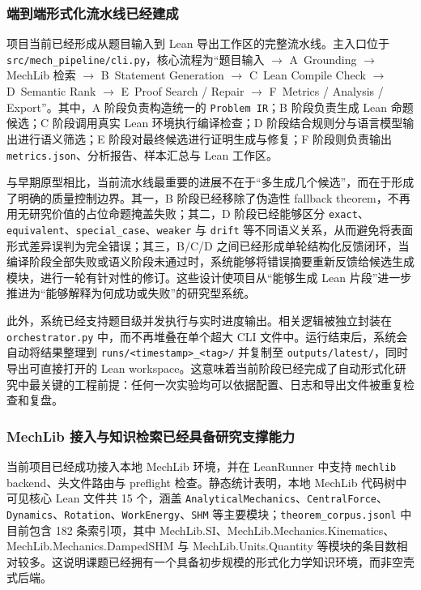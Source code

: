 \documentclass[12pt,a4paper]{ctexart}
\begin{document}
\subsubsection{端到端形式化流水线已经建成}

项目当前已经形成从题目输入到 Lean 导出工作区的完整流水线。主入口位于 \texttt{src/mech\_pipeline/cli.py}，核心流程为“题目输入 $\rightarrow$ A~Grounding $\rightarrow$ MechLib 检索 $\rightarrow$ B~Statement Generation $\rightarrow$ C~Lean Compile Check $\rightarrow$ D~Semantic Rank $\rightarrow$ E~Proof Search / Repair $\rightarrow$ F~Metrics / Analysis / Export”。其中，A 阶段负责构造统一的 \texttt{Problem IR}；B 阶段负责生成 Lean 命题候选；C 阶段调用真实 Lean 环境执行编译检查；D 阶段结合规则分与语言模型输出进行语义筛选；E 阶段对最终候选进行证明生成与修复；F 阶段则负责输出 \texttt{metrics.json}、分析报告、样本汇总与 Lean 工作区。

与早期原型相比，当前流水线最重要的进展不在于“多生成几个候选”，而在于形成了明确的质量控制边界。其一，B 阶段已经移除了伪造性 fallback theorem，不再用无研究价值的占位命题掩盖失败；其二，D 阶段已经能够区分 \texttt{exact}、\texttt{equivalent}、\texttt{special\_case}、\texttt{weaker} 与 \texttt{drift} 等不同语义关系，从而避免将表面形式差异误判为完全错误；其三，B/C/D 之间已经形成单轮结构化反馈闭环，当编译阶段全部失败或语义阶段未通过时，系统能够将错误摘要重新反馈给候选生成模块，进行一轮有针对性的修订。这些设计使项目从“能够生成 Lean 片段”进一步推进为“能够解释为何成功或失败”的研究型系统。

此外，系统已经支持题目级并发执行与实时进度输出。相关逻辑被独立封装在 \texttt{orchestrator.py} 中，而不再堆叠在单个超大 CLI 文件中。运行结束后，系统会自动将结果整理到 \texttt{runs/<timestamp>\_<tag>/} 并复制至 \texttt{outputs/latest/}，同时导出可直接打开的 Lean workspace。这意味着当前阶段已经完成了自动形式化研究中最关键的工程前提：任何一次实验均可以依据配置、日志和导出文件被重复检查和复盘。

\subsubsection{MechLib 接入与知识检索已经具备研究支撑能力}

当前项目已经成功接入本地 MechLib 环境，并在 LeanRunner 中支持 \texttt{mechlib} backend、头文件路由与 preflight 检查。静态统计表明，本地 MechLib 代码树中可见核心 Lean 文件共 15 个，涵盖 \texttt{AnalyticalMechanics}、\texttt{CentralForce}、\texttt{Dynamics}、\texttt{Rotation}、\texttt{WorkEnergy}、\texttt{SHM} 等主要模块；\texttt{theorem\_corpus.jsonl} 中目前包含 182 条索引项，其中 MechLib.SI、MechLib.Mechanics.Kinematics、MechLib.Mechanics.DampedSHM 与 MechLib.Units.Quantity 等模块的条目数相对较多。这说明课题已经拥有一个具备初步规模的形式化力学知识环境，而非空壳式后端。
\end{document}
